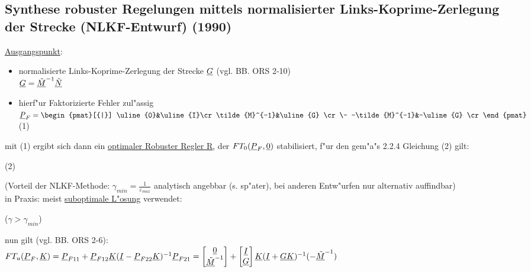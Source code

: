 \documentclass[openany,a4paper,11pt]{book}
\begin{document}
\subsection{Synthese robuster Regelungen mittels normalisierter Links-Koprime-Zerlegung der Strecke (NLKF-Entwurf) (1990)}
\uline{Ausgangspunkt}: \begin{itemize}
    \item normalisierte Links-Koprime-Zerlegung der Strecke $\uline{G}$ (vgl. BB. ORS 2-10)\\
    $\uline{G}=\uline{\tilde{M}}^{-1}\uline{\tilde{N}}$
    \item hierf"ur Faktorizierte Fehler zul"assig\\
    $\displaystyle\uline{P}_F=\begin{pmat}[{|}] \uline{0}&\uline{I}\cr \tilde{M}^{-1}&\uline{G} \cr \- -\tilde{M}^{-1}&-\uline{G} \cr
    \end{pmat}$  \quad (1)
\end{itemize}
mit (1) ergibt sich dann ein \uline{optimaler Robuster Regler \uline{R}}, der $FT_0(\uline{P}_F,\uline{0})$ stabilisiert, f"ur den gem"a"s 2.2.4 Gleichung (2) gilt:\\
\begin{centering} \quad (2)\\[2pt] \end{centering}
(Vorteil der NLKF-Methode: $\displaystyle\gamma_{min}=\frac{1}{\varepsilon_{max}}$ analytisch angebbar (s. sp"ater), bei anderen Entw"urfen nur alternativ auffindbar)\\
in Praxis: meist \uline{suboptimale L"osung} verwendet:\\[3pt]
\begin{centering} \quad ($\gamma>\gamma_{min}$)\\\end{centering}
nun gilt (vgl. BB. ORS 2-6):\\
$FT_u(\uline{P}_F,\uline{K})=\uline{P}_{F11}+\uline{P}_{F12}\uline{K}(\uline{I}-\uline{P}_{F22}\uline{K})^{-1}\uline{P}_{F21}=\begin{bmatrix}\uline{0}\\\uline{\tilde{M}}^{-1}\end{bmatrix}+\begin{bmatrix}\uline{I}\\\uline{G}\end{bmatrix}\uline{K}(\uline{I}+\uline{GK})^{-1}(-\uline{\tilde{M}}^{-1})$\\
\end{document}
